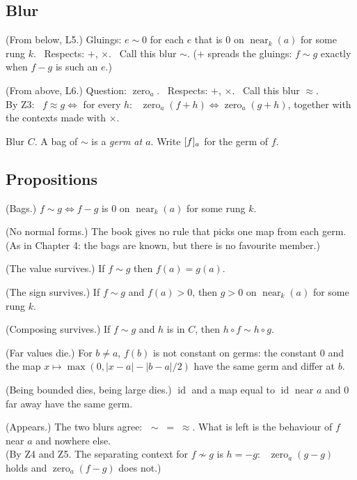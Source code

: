\subsection*{Blur}

\begin{lines}
\item[\lab{B1}] (From below, L5.) Gluings: $e \sim 0$ for each $e$ that is $0$ on $\operatorname{near}_k(a)$ for some rung $k$. \ Respects: $+$, $\times$. \ Call this blur $\sim$. ($+$ spreads the gluings: $f \sim g$ exactly when $f - g$ is such an $e$.)
\item[\lab{B2}] (From above, L6.) Question: $\operatorname{zero}_a$. \ Respects: $+$, $\times$. \ Call this blur $\approx$. \\
By Z3: \ $f \approx g \iff$ for every $h$: \ $\operatorname{zero}_a(f + h) \Leftrightarrow \operatorname{zero}_a(g + h)$, together with the contexts made with $\times$.
\item[] Blur $C$. A bag of $\sim$ is a \emph{germ at $a$}. Write $[f]_a$ for the germ of $f$.
\end{lines}

\subsection*{Propositions}

\begin{lines}
\item[\lab{P3}] (Bags.) $f \sim g \iff f - g$ is $0$ on $\operatorname{near}_k(a)$ for some rung $k$.
\item[\lab{P4}] (No normal forms.) The book gives no rule that picks one map from each germ. (As in Chapter 4: the bags are known, but there is no favourite member.)
\item[\lab{P5.1}] (The value survives.) If $f \sim g$ then $f(a) = g(a)$.
\item[\lab{P5.2}] (The sign survives.) If $f \sim g$ and $f(a) > 0$, then $g > 0$ on $\operatorname{near}_k(a)$ for some rung $k$.
\item[\lab{P5.3}] (Composing survives.) If $f \sim g$ and $h$ is in $C$, then $h \circ f \sim h \circ g$.
\item[\lab{P6.1}] (Far values die.) For $b \neq a$, $f(b)$ is not constant on germs: the constant $0$ and the map $x \mapsto \max(0, |x - a| - |b - a|/2)$ have the same germ and differ at $b$.
\item[\lab{P6.2}] (Being bounded dies, being large dies.) $\operatorname{id}$ and a map equal to $\operatorname{id}$ near $a$ and $0$ far away have the same germ.
\item[\lab{P7}] (Appears.) The two blurs agree: $\;\sim \;=\; \approx$. What is left is the behaviour of $f$ near $a$ and nowhere else. \\
(By Z4 and Z5. The separating context for $f \not\sim g$ is $h = -g$: \ $\operatorname{zero}_a(g - g)$ holds and $\operatorname{zero}_a(f - g)$ does not.)
\end{lines}

